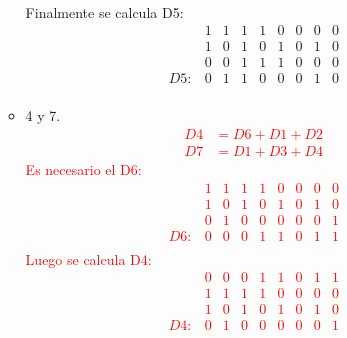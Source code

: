 \documentclass{templateNote}
\begin{document}
\begin{itemize}
\begin{itemize}
{\begin{equation*}
\begin{array}{ccccccccc}
                \end{array}
            \end{equation*}
            Finalmente se calcula D5:
            \begin{equation*}
                \begin{array}{ccccccccc}
                    & 1 & 1 & 1 & 1 & 0 & 0 & 0 & 0 \\
                    & 1 & 0 & 1 & 0 & 1 & 0 & 1 & 0 \\
                    & 0 & 0 & 1 & 1 & 1 & 0 & 0 & 0 \\ \hline
                D5: & 0 & 1 & 1 & 0 & 0 & 0 & 1 & 0 \\
                \end{array}
            \end{equation*}
        }
        \item 4 y 7.
        \textcolor{red}{
            \begin{align*}
                D4 &= D6 + D1 + D2 \\
                D7 &= D1 + D3 + D4
            \end{align*}
            Es necesario el D6:
            \begin{equation*}
                \begin{array}{ccccccccc}
                    & 1 & 1 & 1 & 1 & 0 & 0 & 0 & 0 \\
                    & 1 & 0 & 1 & 0 & 1 & 0 & 1 & 0 \\
                    & 0 & 1 & 0 & 0 & 0 & 0 & 0 & 1 \\ \hline
                D6: & 0 & 0 & 0 & 1 & 1 & 0 & 1 & 1 \\
                \end{array}
            \end{equation*}
            Luego se calcula D4:
            \begin{equation*}
                \begin{array}{ccccccccc}
                    & 0 & 0 & 0 & 1 & 1 & 0 & 1 & 1 \\
                    & 1 & 1 & 1 & 1 & 0 & 0 & 0 & 0 \\
                    & 1 & 0 & 1 & 0 & 1 & 0 & 1 & 0 \\ \hline
                D4: & 0 & 1 & 0 & 0 & 0 & 0 & 0 & 1 \\
                \end{array}
            \end{equation*}
}
\end{itemize}
\end{itemize}
\end{document}
